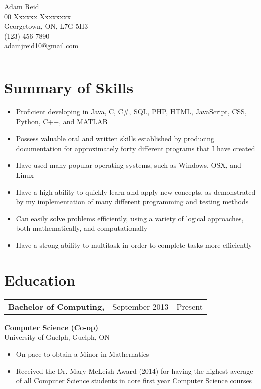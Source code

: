 \documentclass[12pt]{article}
\newcommand{\doublespace}{\vspace{8pt}}
\begin{document}
{\huge Adam Reid}\\
00 Xxxxxx Xxxxxxxx\\
Georgetown, ON, L7G 5H3\\
(123)-456-7890\\
\href{mailto:adamjreid10@gmail.com}{adamjreid10@gmail.com}
\noindent\rule{6in}{0.4pt}

\doublespace

\section{Summary of Skills}

\doublespace

{ 
  \small
  \begin{itemize}
    \item Proficient developing in Java, C, C\#, SQL, PHP, HTML, JavaScript, CSS, Python, C++, and MATLAB
    \item Possess valuable oral and written skills established by producing documentation for approximately forty different programs that I have created
    \item Have used many popular operating systems, such as Windows, OSX, and Linux
    \item Have a high ability to quickly learn and apply new concepts, as demonstrated by my implementation of many different programming and testing methods
    \item Can easily solve problems efficiently, using a variety of logical approaches, both mathematically, and computationally
    \item Have a strong ability to multitask in order to complete tasks more efficiently
  \end{itemize}
}

\doublespace

\section{Education}

\doublespace

{
  \small
  \noindent\begin{tabu} {@{} X[l] X[r]}
    \textbf{Bachelor of Computing,} & September 2013 - Present
  \end{tabu}
  \textbf{Computer Science (Co-op)}\\
  University of Guelph, Guelph, ON
  \begin{itemize}
    \item On pace to obtain a Minor in Mathematics
    \item Received the Dr. Mary McLeish Award (2014) for having the highest average of all Computer Science students in core first year Computer Science courses
  \end{itemize}
}
\end{document}
